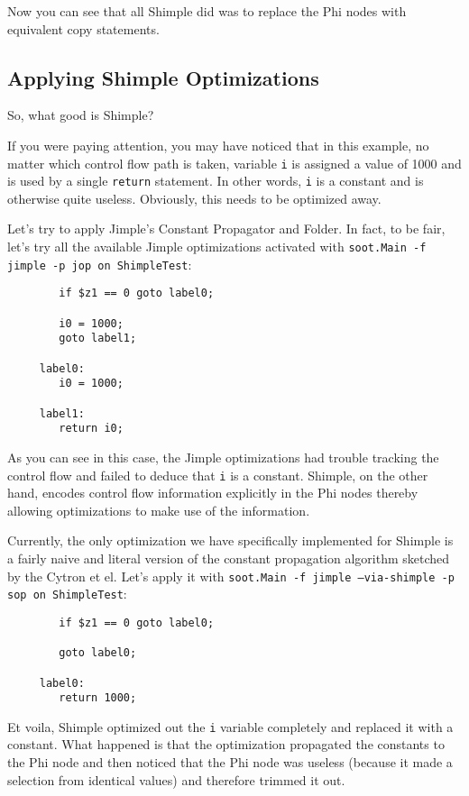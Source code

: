 \documentclass[10pt,letterpaper,oneside,onecolumn]{article}
\begin{document}
Now you can see that all Shimple did was to replace the Phi nodes
with equivalent copy statements.

\subsection{Applying Shimple Optimizations}

So, what good is Shimple?  

If you were paying attention, you may have noticed that in this
example, no matter which control flow path is taken, variable {\tt i}
is assigned a value of 1000 and is used by a single {\tt return}
statement.  In other words, {\tt i} is a constant and is otherwise
quite useless.  Obviously, this needs to be optimized away.

Let's try to apply Jimple's Constant Propagator and Folder.  In fact,
to be fair, let's try all the available  Jimple optimizations activated
with {\tt soot.Main -f jimple -p jop on ShimpleTest}:

\begin{verbatim}
        if $z1 == 0 goto label0;

        i0 = 1000;
        goto label1;

     label0:
        i0 = 1000;

     label1:
        return i0;
\end{verbatim}

As you can see in this case, the Jimple optimizations had trouble
tracking the control flow and failed to deduce that {\tt i} is a
constant.  Shimple, on the other hand, encodes control flow
information explicitly in the Phi nodes thereby allowing optimizations
to make use of the information.

Currently, the only optimization we have specifically implemented for
Shimple is a fairly naive and literal version of the constant
propagation algorithm sketched by the Cytron et el.  Let's apply it
with {\tt soot.Main -f jimple --via-shimple -p sop on ShimpleTest}:

\begin{verbatim}
        if $z1 == 0 goto label0;

        goto label0;

     label0:
        return 1000;
\end{verbatim}

Et voila, Shimple optimized out the {\tt i} variable completely and
replaced it with a constant.  What happened is that the optimization
propagated the constants to the Phi node and then noticed that the
Phi node was useless (because it made a selection from identical
values) and therefore trimmed it out.
\end{document}

